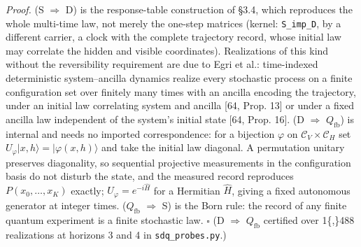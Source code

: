 \documentclass[
]{article}
\begin{document}
\emph{Proof.} (S \(\Rightarrow\) D) is the response-table construction
of §3.4, which reproduces the whole multi-time law, not merely the
one-step matrices (kernel: \texttt{S\_imp\_D}, by a different carrier, a
clock with the complete trajectory record, whose initial law may
correlate the hidden and visible coordinates). Realizations of this kind
without the reversibility requirement are due to Egri et al.:
time-indexed deterministic system--ancilla dynamics realize every
stochastic process on a finite configuration set over finitely many
times with an ancilla encoding the trajectory, under an initial law
correlating system and ancilla {[}64, Prop. 13{]} or under a fixed
ancilla law independent of the system's initial state {[}64, Prop.
16{]}. (D \(\Rightarrow\) \(Q_{\mathrm{fb}}\)) is internal and needs no
imported correspondence: for a bijection \(\varphi\) on
\(\mathcal{C}_V \times \mathcal{C}_H\) set
\(U_\varphi |x, h\rangle = |\varphi(x,h)\rangle\) and take the initial
law diagonal. A permutation unitary preserves diagonality, so sequential
projective measurements in the configuration basis do not disturb the
state, and the measured record reproduces \(P(x_0, \ldots, x_K)\)
exactly; \(U_\varphi = e^{-i\hat H}\) for a Hermitian \(\hat H\), giving
a fixed autonomous generator at integer times. (\(Q_{\mathrm{fb}}\)
\(\Rightarrow\) S) is the Born rule: the record of any finite quantum
experiment is a finite stochastic law. \(\square\) (D \(\Rightarrow\)
\(Q_{\mathrm{fb}}\) certified over 1\{,\}488 realizations at horizons 3
and 4 in \texttt{sdq\_probes.py}.)
\end{document}
